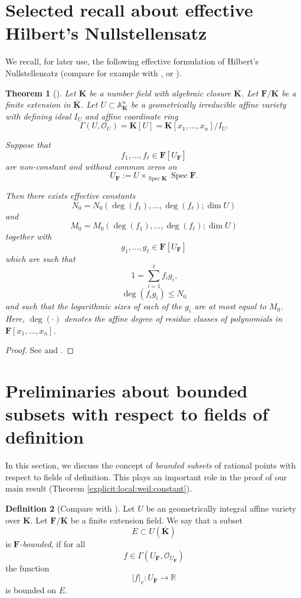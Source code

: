 \documentclass[10pt]{amsart}
\renewcommand{\leq}{\leqslant}
\newcommand{\Osh}{{\mathcal O}}                        %
\newcommand{\spec}{\operatorname{Spec}}
\newcommand{\KK}{\mathbf{K}}
\newcommand{\FF}{\mathbf{F}}
\renewcommand{\AA}{\mathbb{A}} %
\newcommand{\RR}{\mathbb{R}} %
\newtheorem{theorem}{Theorem}[section]
\theoremstyle{definition}
\newtheorem{defn}[theorem]{Definition}
\numberwithin{equation}{section}
\begin{document}
\section{Selected recall about effective Hilbert's Nullstellensatz}\label{effective:nullstellensatz}


We recall, for later use, the following effective formulation of Hilbert's Nullstellensatz (compare for example with  \cite{Masser:Wustholz:1983}, \cite{Kollar:1999} or \cite{Jelonek:2005}).  

\begin{theorem}[\cite{Jelonek:2005}]\label{effective:Hilbert:Nullstellensatz}
Let $\KK$ be a number field with algebraic closure $\overline{\KK}$.  Let $\FF / \KK$ be a finite extension in $\overline{\KK}$.  Let $U \subset \AA^n_{\KK}$ be a geometrically irreducible affine variety with defining ideal $I_U$ and affine coordinate ring
$$
\Gamma(U,\Osh_U) = \KK[U] = \KK[x_1,\dots,x_n]/I_U \text{.}
$$
  
Suppose that 
$$
f_1,\dots,f_\ell \in \FF[U_{\FF}]
$$
are non-constant and without common zeros on 
$$U_{\FF} := U \times_{\spec \KK} \spec \FF \text{.}$$ 

Then there exists effective constants 
$$N_0 = N_0(\deg(f_1),\dots,\deg(f_\ell);\dim U)$$ 
and 
$$M_0 = M_0(\deg(f_1),\dots,\deg(f_\ell);\dim U)$$ 
together with 
$$g_1,\dots,g_{\ell} \in \FF[U_{\FF}]$$ 
which are such that
$$
1 = \sum_{i=1}^\ell f_i g_i \text{,}
$$
$$
\deg(f_i g_i) \leq N_0
$$
and such that the \emph{logarithmic sizes} of each of the $g_i$ are at most equal to $M_0$.  Here, $\deg(\cdot)$ denotes the affine degree of residue classes of polynomials in $\FF[x_1,\dots,x_n]$.
\end{theorem}

\begin{proof}
See \cite{Jelonek:2005} and \cite{Masser:Wustholz:1983}.
\end{proof}


\section{Preliminaries about bounded subsets with respect to fields of definition}\label{FF:bounded:subsets}

In this section, we discuss the concept of \emph{bounded subsets} of rational points with respect to fields of definition.  This plays an important role in the proof of our main result (Theorem \ref{explicit:local:weil:constant}).

\begin{defn}[Compare with {\cite[Definition 2.2.8]{Bombieri:Gubler}}]\label{FF:bounded:subset}
Let $U$ be an geometrically integral affine variety over $\KK$.  Let $\FF / \KK$ be a finite extension field.  We say that a subset 
$$
E \subset U(\overline{\KK}) 
$$
is \emph{$\FF$-bounded}, if for all
$$
f \in \Gamma(U_{\FF},\Osh_{U_{\FF}}) 
$$
the function
$$
|f|_v \colon U_{\FF} \rightarrow \RR
$$
is bounded on $E$.
\end{defn}
\end{document}
